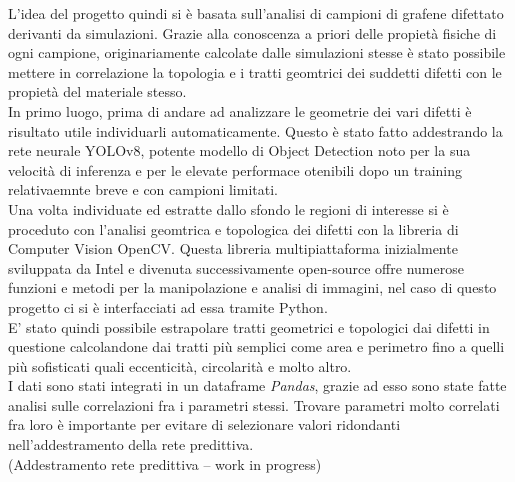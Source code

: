 \documentclass[12pt,a4paper,openright,twoside]{report}
\begin{document}
L'idea del progetto quindi si è basata sull'analisi di campioni di grafene difettato derivanti da simulazioni. Grazie alla conoscenza a priori delle propietà fisiche di ogni campione, originariamente calcolate dalle simulazioni stesse è stato possibile mettere in correlazione la topologia e i tratti geomtrici dei suddetti difetti con le propietà del materiale stesso.\\
In primo luogo, prima di andare ad analizzare le geometrie dei vari difetti è risultato utile individuarli automaticamente. 
Questo è stato fatto addestrando la rete neurale YOLOv8, potente modello di Object Detection noto per la sua velocità di inferenza e per le elevate performace otenibili dopo un training relativaemnte breve e con campioni limitati.\\
Una volta individuate ed estratte dallo sfondo le regioni di interesse si è proceduto con l'analisi geomtrica e topologica dei difetti con la libreria di Computer Vision OpenCV.
Questa libreria multipiattaforma inizialmente sviluppata da Intel e divenuta successivamente open-source offre numerose funzioni e metodi per la manipolazione e analisi di immagini, nel caso di questo progetto ci si è interfacciati ad essa tramite Python. \\
E' stato quindi possibile estrapolare tratti geometrici e topologici dai difetti in questione calcolandone dai tratti più semplici come area e perimetro fino a quelli più sofisticati quali eccenticità, circolarità e molto altro.\\
I dati sono stati integrati in un dataframe \emph{Pandas}, grazie ad esso sono state fatte analisi sulle correlazioni fra i parametri stessi. Trovare parametri molto correlati fra loro è importante per evitare di selezionare valori ridondanti nell'addestramento della rete predittiva.\\

(Addestramento rete predittiva -- work in progress)
\clearpage{\pagestyle{empty}\cleardoublepage}
\rhead[\fancyplain{}{\bfseries\leftmark}]{\fancyplain{}{\bfseries\thepage}}
\end{document}
